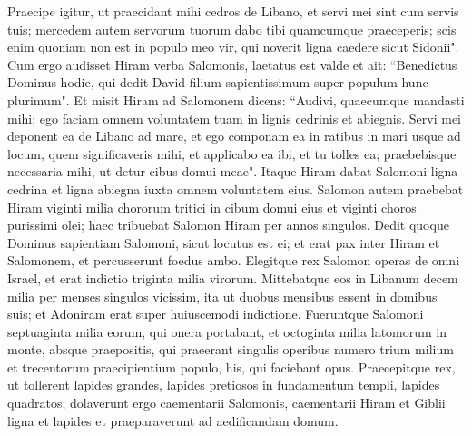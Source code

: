 \begin{biblechapter}
\verse Praecipe igitur, ut praecidant mihi cedros de Libano, et servi mei sint cum servis tuis; mercedem autem servorum tuorum dabo tibi quamcumque praeceperis; scis enim quoniam non est in populo meo vir, qui noverit ligna caedere sicut Sidonii". 
\verse Cum ergo audisset Hiram verba Salomonis, laetatus est valde et ait: “Benedictus Dominus hodie, qui dedit David filium sapientissimum super populum hunc plurimum". 
\verse Et misit Hiram ad Salomonem dicens: “Audivi, quaecumque mandasti mihi; ego faciam omnem voluntatem tuam in lignis cedrinis et abiegnis. 
\verse Servi mei deponent ea de Libano ad mare, et ego componam ea in ratibus in mari usque ad locum, quem significaveris mihi, et applicabo ea ibi, et tu tolles ea; praebebisque necessaria mihi, ut detur cibus domui meae". 
\verse Itaque Hiram dabat Salomoni ligna cedrina et ligna abiegna iuxta omnem voluntatem eius. 
\verse Salomon autem praebebat Hiram viginti milia chororum tritici in cibum domui eius et viginti choros purissimi olei; haec tribuebat Salomon Hiram per annos singulos. 
\verse Dedit quoque Dominus sapientiam Salomoni, sicut locutus est ei; et erat pax inter Hiram et Salomonem, et percusserunt foedus ambo. 
\verse Elegitque rex Salomon operas de omni Israel, et erat indictio triginta milia virorum. 
\verse Mittebatque eos in Libanum decem milia per menses singulos vicissim, ita ut duobus mensibus essent in domibus suis; et Adoniram erat super huiuscemodi indictione. 
\verse Fueruntque Salomoni septuaginta milia eorum, qui onera portabant, et octoginta milia latomorum in monte, 
\verse absque praepositis, qui praeerant singulis operibus numero trium milium et trecentorum praecipientium populo, his, qui faciebant opus. 
\verse Praecepitque rex, ut tollerent lapides grandes, lapides pretiosos in fundamentum templi, lapides quadratos; 
\verse dolaverunt ergo caementarii Salomonis, caementarii Hiram et Giblii ligna et lapides et praeparaverunt ad aedificandam domum. 
\end{biblechapter}

